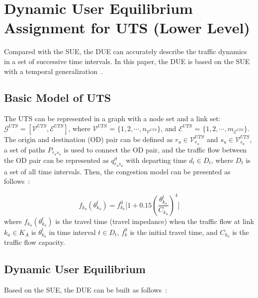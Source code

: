 \documentclass[final]{IEEEtran}
\begin{document}
\section{Dynamic User Equilibrium Assignment for UTS (Lower Level) }\label{Sec:UTS}
Compared with the SUE, the DUE can accurately describe the traffic dynamics in a set of successive time intervals. In this paper, the DUE is based on the SUE with a temporal generalization~\cite{ja123nson1991dynamic,sheffy1985ur123ban}. 
\subsection{Basic Model of UTS}\label{Sec:UTS1}
The UTS can be represented in a graph with a node set and a link set: $\mathcal{G}^{UTS} = [\mathcal{V}^{UTS}, \mathcal{E}^{UTS}]$, where $\mathcal{V}^{UTS}$ = $\{1,2,\cdots, n_{\mathcal{V}^{UTS}}\}$, and $\mathcal{E}^{UTS}$ = $\{1,2,\cdots, m_{\mathcal{E}^{UTS}}\}$. The origin and destination (OD) pair can be defined as $r_u \in \mathcal{V}^{UTS}_{r_u}$ and $s_u \in \mathcal{V}^{UTS}_{s_u}$, a set of paths $P_{r_us_u}$ is used to connect the OD pair, and the traffic flow between the OD pair can be represented as $q^d_{r_us_u}$ with departing time $d_t \in D_t$, where $D_t$ is a set of all time intervals. Then, the congestion model can be presented as follows~\cite{manual1964b123ureau}:

\begin{equation}\label{equ:cong}
f_{k_a}(\theta^t_{k_a}) = f^0_{k_a}\bigg[1+0.15(\frac{\theta^t_{k_a}}{C_{k_a}})^4\bigg]
\end{equation}
where $f_{k_a}(\theta^t_{k_a})$ is the travel time (travel impedance) when the traffic flow at link $k_a \in K_A$ is $\theta^t_{k_a}$ in time interval $t\in D_t$, $f^0_k$ is the initial travel time, and $C_{k_a}$ is the traffic flow capacity.
\subsection{Dynamic User Equilibrium}
Based on the SUE, the DUE can be built as follows~\cite{ja123nson1991dynamic}:
\end{document}

